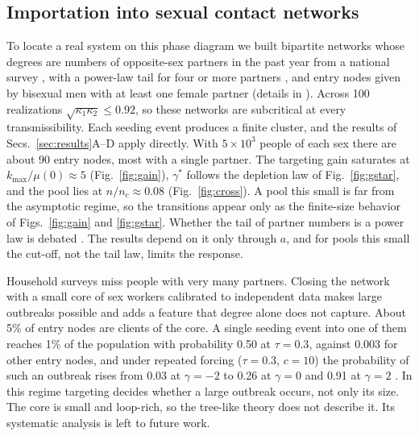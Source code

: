 \documentclass[pre,twocolumn,superscriptaddress,amsmath,amssymb,floatfix]{revtex4-2}
\begin{document}
\subsection{Importation into sexual contact networks}
To locate a real system on this phase diagram we built bipartite networks whose
degrees are numbers of opposite-sex partners in the past year from a national
survey \cite{chandra2011sexual}, with a power-law tail for four or more
partners \cite{liljeros2001web}, and entry nodes given by bisexual men with at
least one female partner \cite{copen2016sexual} (details in \cite{SM}). Across
100 realizations $\sqrt{\kappa_1\kappa_2}\le0.92$, so these networks are subcritical at
every transmissibility. Each seeding event produces a finite cluster, and the
results of Secs.~\ref{sec:results}A--D apply directly. With $5\times10^3$ people of
each sex there are about 90 entry nodes, most with a single partner. The
targeting gain saturates at $k_{\max}/\mu(0)\approx5$ (Fig.~\ref{fig:gain}), $\gamma^*$ follows the
depletion law of Fig.~\ref{fig:gstar}, and the pool lies at $n/n_c\approx0.08$
(Fig.~\ref{fig:cross}). A pool this small is far from the asymptotic regime, so
the transitions appear only as the finite-size behavior of Figs.~\ref{fig:gain}
and \ref{fig:gstar}.
Whether the tail of partner numbers is a power law is debated
\cite{jones2003assessment,handcock2004likelihood}. The results depend on it
only through $a$, and for pools this small the cut-off, not the tail law,
limits the response.

Household surveys miss people with very many partners. Closing the network
with a small core of sex workers calibrated to independent data
\cite{brewer2000prostitution} makes large outbreaks possible and adds a
feature that degree alone does not capture. About 5\% of entry nodes are
clients of the core. A single seeding event into one of them
reaches 1\% of the population with probability 0.50 at $\tau=0.3$, against 0.003
for other entry nodes, and under repeated forcing ($\tau=0.3$, $c=10$) the
probability of such an outbreak rises from 0.03 at $\gamma=-2$ to 0.26 at $\gamma=0$ and
0.91 at $\gamma=2$ \cite{SM}. In this regime targeting decides whether a large
outbreak occurs, not only its size. The core is small and loop-rich, so the
tree-like theory does not describe it. Its systematic analysis is left to
future work.

\end{document}
